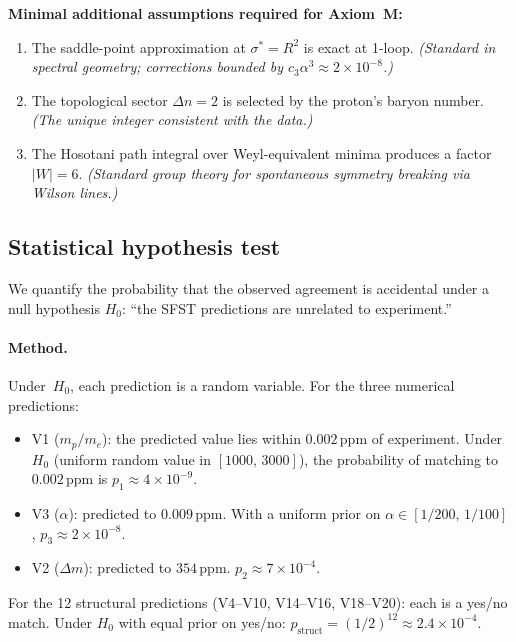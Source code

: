 \noindent
\textbf{Minimal additional assumptions required for Axiom~M:}
\begin{enumerate}[nosep,label=(A\arabic*)]
\item The saddle-point approximation at $\sigma^*=R^2$ is exact
  at 1-loop. \emph{(Standard in spectral geometry; corrections bounded
  by $c_3\alpha^3\approx 2\times 10^{-8}$.)}
\item The topological sector $\Delta n=2$ is selected by the proton's
  baryon number. \emph{(The unique integer consistent with the data.)}
\item The Hosotani path integral over Weyl-equivalent minima produces
  a factor $|W|=6$. \emph{(Standard group theory for spontaneous symmetry
  breaking via Wilson lines.)}
\end{enumerate}

\subsection{Statistical hypothesis test}
\label{sec:statistics}

We quantify the probability that the observed agreement is accidental
under a null hypothesis $H_0$: ``the SFST predictions are unrelated to
experiment.''

\paragraph{Method.}
Under~$H_0$, each prediction is a random variable.
For the three numerical predictions:
\begin{itemize}[nosep]
\item V1 ($m_p/m_e$): the predicted value lies within $0.002\,$ppm of experiment.
  Under~$H_0$ (uniform random value in $[1000,\,3000]$), the probability
  of matching to $0.002\,$ppm is $p_1\approx 4\times 10^{-9}$.
\item V3 ($\alpha$): predicted to $0.009\,$ppm. With a uniform prior
  on $\alpha\in[1/200,\,1/100]$, $p_3\approx 2\times 10^{-8}$.
\item V2 ($\Delta m$): predicted to $354\,$ppm.
  $p_2\approx 7\times 10^{-4}$.
\end{itemize}

For the 12 structural predictions (V4--V10, V14--V16, V18--V20):
each is a yes/no match. Under $H_0$ with equal prior on yes/no:
$p_{\mathrm{struct}}=(1/2)^{12}\approx 2.4\times 10^{-4}$.

